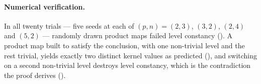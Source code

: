 \paragraph{Numerical verification.}
In all twenty trials --- five seeds at each of $(p,n) = (2,3)$, $(3,2)$, $(2,4)$
and $(5,2)$ --- randomly drawn product maps failed level constancy
(). A
product map built to satisfy the conclusion, with one non-trivial level and the rest
trivial, yields exactly two distinct kernel values as predicted
(), and
switching on a second non-trivial level destroys level constancy, which is the
contradiction the proof derives
().
